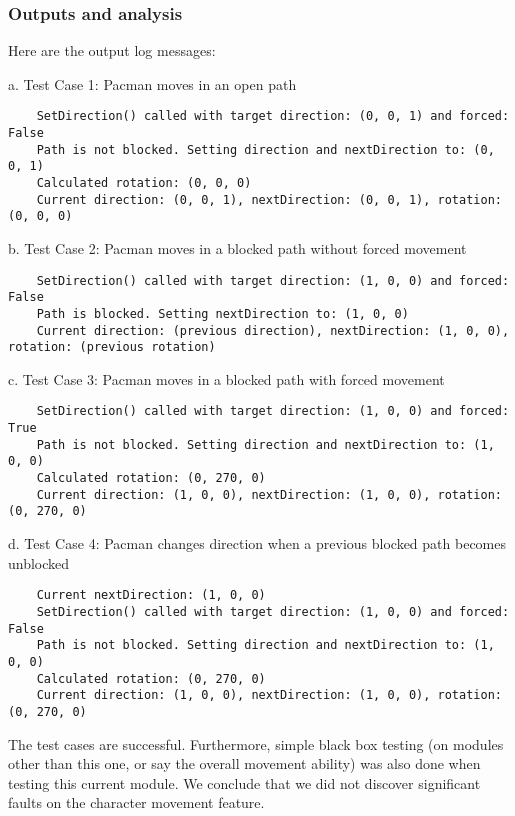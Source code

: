 \documentclass[11pt]{article}
\begin{document}
    \subsubsection*{Outputs and analysis}
    Here are the output log messages:
    
    \item a. Test Case 1: Pacman moves in an open path
    \begin{lstlisting}
    SetDirection() called with target direction: (0, 0, 1) and forced: False
    Path is not blocked. Setting direction and nextDirection to: (0, 0, 1)
    Calculated rotation: (0, 0, 0)
    Current direction: (0, 0, 1), nextDirection: (0, 0, 1), rotation: (0, 0, 0)
    \end{lstlisting}

    \item b. Test Case 2: Pacman moves in a blocked path without forced movement
    \begin{lstlisting}
    SetDirection() called with target direction: (1, 0, 0) and forced: False
    Path is blocked. Setting nextDirection to: (1, 0, 0)
    Current direction: (previous direction), nextDirection: (1, 0, 0), rotation: (previous rotation)
    \end{lstlisting}

    \item c. Test Case 3: Pacman moves in a blocked path with forced movement
    \begin{lstlisting}
    SetDirection() called with target direction: (1, 0, 0) and forced: True
    Path is not blocked. Setting direction and nextDirection to: (1, 0, 0)
    Calculated rotation: (0, 270, 0)
    Current direction: (1, 0, 0), nextDirection: (1, 0, 0), rotation: (0, 270, 0)
    \end{lstlisting}

    \item d. Test Case 4: Pacman changes direction when a previous blocked path becomes unblocked
    \begin{lstlisting}
    Current nextDirection: (1, 0, 0)
    SetDirection() called with target direction: (1, 0, 0) and forced: False
    Path is not blocked. Setting direction and nextDirection to: (1, 0, 0)
    Calculated rotation: (0, 270, 0)
    Current direction: (1, 0, 0), nextDirection: (1, 0, 0), rotation: (0, 270, 0)
    \end{lstlisting}

    The test cases are successful. Furthermore, simple black box testing (on modules other than this one, or say the overall movement ability) was also done when testing this current module. We conclude that we did not discover significant faults on the character movement feature.
    
\end{document}
